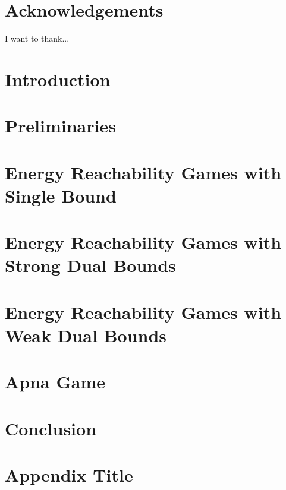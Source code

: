 \documentclass[a4paper,12pt, twoside]{book}
\theoremstyle{definition}
\begin{document}
\chapter*{Acknowledgements}
I want to thank...

\tableofcontents

\chapter{Introduction}

 
\chapter{Preliminaries}

 
\chapter{Energy Reachability Games with Single Bound}

 
\chapter{Energy Reachability Games with Strong Dual Bounds}


\chapter{Energy Reachability Games with Weak Dual Bounds}

 
\chapter{Apna Game}


\chapter{Conclusion}





\appendix
\chapter{Appendix Title}

\end{document}
